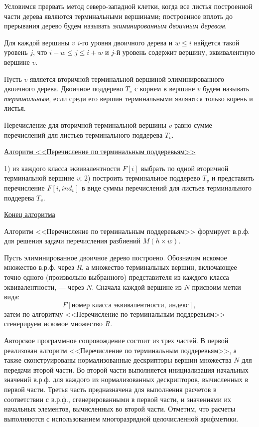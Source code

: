 Условимся прервать метод северо-западной клетки, когда все листья построенной части дерева являются терминальными вершинами; построенное вплоть до прерывания дерево будем называть \textit{ элиминированным двоичным деревом}.

\begin{statement} \label{akm1the3}
Для каждой вершины $v$  $i$-го уровня двоичного дерева и ${w\leq i}$ найдется такой уровень $j$, что  $i-w\leq j\leq i+w$ и $j$-й уровень содержит вершину, эквивалентную вершине $v$.
\end{statement}

Пусть $v$ является вторичной терминальной вершиной элиминированного двоичного дерева. Двоичное поддерево $T_v$   с корнем в вершине $v$ будем называть \textit{ терминальным}, если среди его вершин терминальными являются только корень и листья.

\begin{statement} \label{akm1the4}
Перечисление для вторичной терминальной вершины $v$ равно сумме перечислений для листьев терминального поддерева $T_v$.
\end{statement}

\underline{Алгоритм <<Перечисление по терминальным поддеревьям>>}

1) из каждого класса эквивалентности $F[i]$ выбрать по одной вторичной терминальной вершине $v$;
2) построить терминальное поддерево $T_v$  и представить перечисление $F[i,ind_v]$ в виде суммы перечислений для листьев терминального поддерева $T_v$.

\underline{Конец алгоритма}

\begin{statement} \label{akm1the5}
Алгоритм <<Перечисление по терминальным поддеревьям>> формирует в.р.ф. для решения задачи перечисления разбиений $M(h\times w)$.
\end{statement}

Пусть элиминированное двоичное дерево построено. Обозначим искомое множество в.р.ф. через $R$, а множество терминальных вершин, включающее точно одного (произвольно выбранного) представителя из каждого класса эквивалентности, --- через $N$. Сначала каждой вершине из $N$ присвоим метки вида:
$$F[\text{номер класса эквивалентности, индекс}],$$
затем по алгоритму <<Перечисление по терминальным поддеревьям>> сгенерируем искомое множество $R$.

Авторское программное сопровождение состоит из трех частей. В первой реализован алгоритм <<Перечисление по терминальным поддеревьям>>, а также сконструированы нормализованные дескрипторы вершин множества $N$ для передачи второй части. Во второй части выполняется инициализация начальных значений в.р.ф. для каждого из нормализованных дескрипторов, вычисленных в первой части. Третья часть предназначена для выполнения расчетов в соответствии с в.р.ф., сгенерированными в первой части, и значениями их начальных элементов, вычисленных во второй части. Отметим, что расчеты выполняются с использованием многоразрядной целочисленной арифметики.

